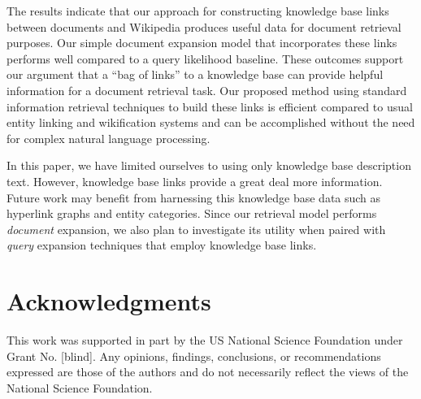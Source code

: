 \documentclass{sig-alternate}
\begin{document}
The results indicate that our approach for constructing knowledge base links between documents and Wikipedia produces useful data for document retrieval purposes. Our simple document expansion model that incorporates these links performs well compared to a query likelihood baseline. These outcomes support our argument that a ``bag of links'' to a knowledge base can provide helpful information for a document retrieval task. Our proposed method using standard information retrieval techniques to build these links is efficient compared to usual entity linking and wikification systems and can be accomplished without the need for complex natural language processing.

In this paper, we have limited ourselves to using only knowledge base description text. However, knowledge base links provide a great deal more information. Future work may benefit from harnessing this knowledge base data such as hyperlink graphs and entity categories. Since our retrieval model performs \textit{document} expansion, we also plan to investigate its utility when paired with \textit{query} expansion techniques that employ knowledge base links.

\section{Acknowledgments}\label{section.acknowledgments}
This work was supported in part by the US National Science Foundation under Grant No. [blind]. Any opinions, findings, conclusions, or recommendations expressed are those of the authors and do not necessarily reflect the views of the National Science Foundation.



  
\end{document}
